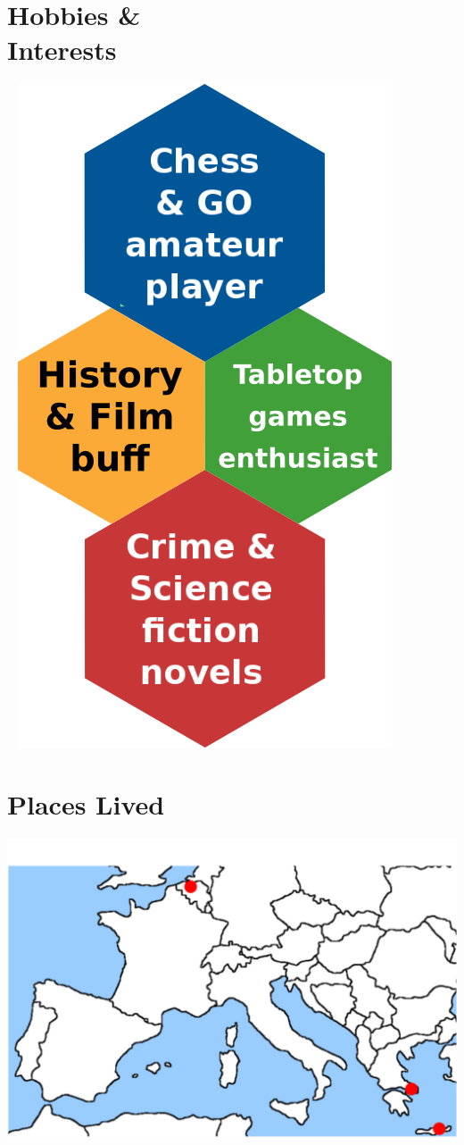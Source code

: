 \documentclass[]{friggeri-cv}
\begin{document}
\begin{aside}
  \section{Hobbies \& \\Interests }
    ~
    \includegraphics[scale=0.20]{img/personal.png}
    ~
 \section{Places Lived}
    \includegraphics[scale=0.10]{img/europe_map_me.png}
    ~
\end{aside}
~
\end{document}
